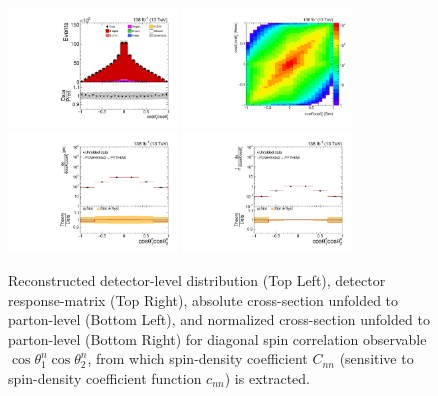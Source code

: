 \clearpage
\begin{figure}[htb]
\begin{center}
 \includegraphics[width=0.40\textwidth]{fig_fullRun2UL/controlplots/combined/Hyp_LLBarCnn.pdf}
 \includegraphics[width=0.40\textwidth]{fig_fullRun2UL/unfolding/combined/ResponseMatrix_c_nn.pdf} \\
 \includegraphics[width=0.40\textwidth]{fig_fullRun2UL/unfolding/combined/UnfoldedResults_c_nn.pdf}
 \includegraphics[width=0.40\textwidth]{fig_fullRun2UL/unfolding/combined/UnfoldedResultsNorm_c_nn.pdf} \\
\label{fig:c_nn}
\caption{Reconstructed detector-level distribution (Top Left), detector response-matrix (Top Right), absolute cross-section unfolded to parton-level (Bottom Left), and normalized cross-section unfolded to parton-level (Bottom Right) for diagonal spin correlation observable $\cos\theta_{1}^{n}\cos\theta_{2}^{n}$, from which spin-density coefficient $C_{nn}$ (sensitive to spin-density coefficient function $c_{n n}$) is extracted.}
\end{center}
\end{figure}
